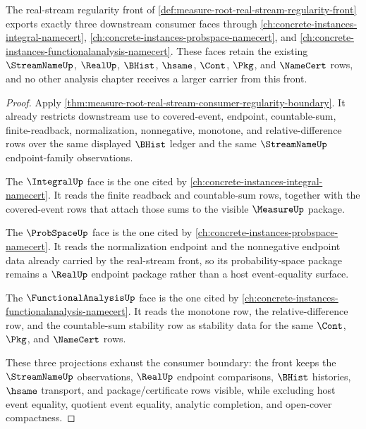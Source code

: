 \begin{theorem}
\label{thm:measure-root-downstream-consumer-lattice}
The real-stream regularity front of
\autoref{def:measure-root-real-stream-regularity-front} exports exactly three
downstream consumer faces through
\autoref{ch:concrete-instances-integral-namecert},
\autoref{ch:concrete-instances-probspace-namecert}, and
\autoref{ch:concrete-instances-functionalanalysis-namecert}. These faces
retain the existing $\StreamNameUp$, $\RealUp$, $\BHist$, $\hsame$, $\Cont$,
$\Pkg$, and $\NameCert$ rows, and no other analysis chapter receives a larger
carrier from this front.
\end{theorem}
\begin{proof}
Apply
\autoref{thm:measure-root-real-stream-consumer-regularity-boundary}. It
already restricts downstream use to covered-event, endpoint, countable-sum,
finite-readback, normalization, nonnegative, monotone, and
relative-difference rows over the same displayed $\BHist$ ledger and the same
$\StreamNameUp$ endpoint-family observations.

The $\IntegralUp$ face is the one cited by
\autoref{ch:concrete-instances-integral-namecert}. It reads the finite
readback and countable-sum rows, together with the covered-event rows that
attach those sums to the visible $\MeasureUp$ package.

The $\ProbSpaceUp$ face is the one cited by
\autoref{ch:concrete-instances-probspace-namecert}. It reads the normalization
endpoint and the nonnegative endpoint data already carried by the real-stream
front, so its probability-space package remains a $\RealUp$ endpoint package
rather than a host event-equality surface.

The $\FunctionalAnalysisUp$ face is the one cited by
\autoref{ch:concrete-instances-functionalanalysis-namecert}. It reads the
monotone row, the relative-difference row, and the countable-sum stability row
as stability data for the same $\Cont$, $\Pkg$, and $\NameCert$ rows.

These three projections exhaust the consumer boundary: the front keeps the
$\StreamNameUp$ observations, $\RealUp$ endpoint comparisons, $\BHist$
histories, $\hsame$ transport, and package/certificate rows visible, while
excluding host event equality, quotient event equality, analytic completion,
and open-cover compactness.
\end{proof}
